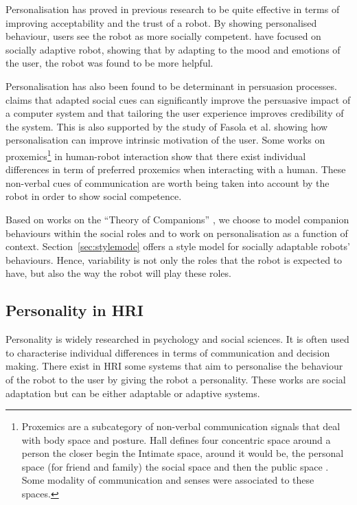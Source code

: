 \documentclass[a4paper,twocolumn]{svjour3}
\begin{document}
Personalisation has proved in previous research to be quite effective in terms of improving acceptability and the trust of a robot. 
By showing personalised behaviour, users see the robot as more socially competent.
\cite{Kuhnlenz2013} have focused on socially adaptive robot, showing that by adapting to the mood and emotions of the user, the robot was found to be more helpful.

Personalisation has also been found to be determinant in persuasion processes. 
\cite{Fogg} claims that adapted social cues can significantly improve the persuasive impact of a computer system and that tailoring the user experience improves credibility of the system. 
This is also supported by the study of Fasola et al. \cite{Fasola2012} showing how personalisation can improve intrinsic motivation of the user. 
Some works on proxemics\footnote{Proxemics are a subcategory of non-verbal communication signals that deal with body space and posture. Hall defines four concentric space around a person the closer begin the Intimate space, around it would be, the personal space (for friend and family) the social space and then the public space \cite{hall1966}. Some modality of communication and senses were associated to these spaces.} \cite{Syrdal2007} in human-robot interaction show that there exist individual differences in term of preferred proxemics when interacting with a human. 
These non-verbal cues of communication are worth being taken into account by the robot in order to show social competence. 


Based on works on the ``Theory of Companions'' \cite{Kramer2011}, we choose to model companion behaviours within the social roles and to work on personalisation as a function of context. 
Section~\ref{sec:stylemode} offers a style model for socially adaptable robots' behaviours.
Hence, variability is not only the roles that the robot is expected to have, but also the way the robot will play these roles.

\subsection{Personality in HRI}
Personality is widely researched in psychology and social sciences. It is often used to characterise individual differences in terms of communication and decision making. 
There exist in HRI some systems that aim to personalise the behaviour of the robot to the user by giving the robot a personality. 
These works are social adaptation but can be either adaptable or adaptive systems. 
\end{document}
